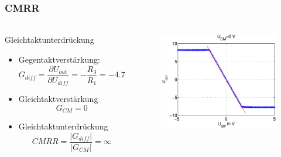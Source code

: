 \begin{frame}
\frametitle{CMRR}
\framesubtitle{}
    \begin{columns}[c]
    \begin{block}{Gleichtaktunterdrückung}
         \begin{itemize}
             \item Gegentaktverstärkung:
             \begin{equation*}
                 G_{diff} = \frac{\partial U_{out}}{\partial U_{diff} } = -
                 \frac{R_3}{R_1}= -4.7
             \end{equation*}
             \item Gleichtaktverstärkung
             \begin{equation*}
                 G_{CM} = 0
             \end{equation*}
             \item Gleichtaktunterdrückung
             \begin{equation*}
                 CMRR= \frac{|G_{diff}|}{|G_{CM}|}=\infty
             \end{equation*}
         \end{itemize}
    \end{block}
    \begin{figure}[H]
    \begin{center}
            \includegraphics[scale=0.3]{./img/plots/Auf_3_Ucm_0.eps}
    \end{center}
    \end{figure}

\end{columns}
\end{frame}
